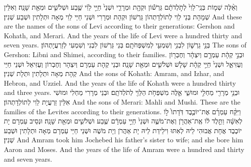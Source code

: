 {%
{וְאֵ֨לֶּה שְׁמ֤וֹת בְּנֵֽי־לֵוִי֙ לְתֹ֣לְדֹתָ֔ם גֵּרְשׁ֕וֹן וּקְהָ֖ת וּמְרָרִ֑י וּשְׁנֵי֙ חַיֵּ֣י לֵוִ֔י שֶׁ֧בַע וּשְׁלֹשִׁ֛ים וּמְאַ֖ת שָׁנָֽה׃
}
{וְאִלֵּין שְׁמָהָת בְּנֵי לֵוִי לְתוֹלְדָתְהוֹן גֵּרְשׁוֹן וּקְהָת וּמְרָרִי וּשְׁנֵי חַיֵּי לֵוִי מְאָה וּתְלָתִין וּשְׁבַע שְׁנִין׃}
{And these are the names of the sons of Levi according to their generations: Gershon and Kohath, and Merari. And the years of the life of Levi were a hundred thirty and seven years.}{}
{בְּנֵ֥י גֵרְשׁ֛וֹן לִבְנִ֥י וְשִׁמְעִ֖י לְמִשְׁפְּחֹתָֽם׃}
{בְּנֵי גֵּרְשׁוֹן לִבְנִי וְשִׁמְעִי לְזַרְעֲיָתְהוֹן׃}
{The sons of Gershon: Libni and Shimei, according to their families.}{}
{וּבְנֵ֣י קְהָ֔ת עַמְרָ֣ם וְיִצְהָ֔ר וְחֶבְר֖וֹן וְעֻזִּיאֵ֑ל וּשְׁנֵי֙ חַיֵּ֣י קְהָ֔ת שָׁלֹ֧שׁ וּשְׁלֹשִׁ֛ים וּמְאַ֖ת שָׁנָֽה׃
}
{וּבְנֵי קְהָת עַמְרָם וְיִצְהָר וְחֶבְרוֹן וְעֻזִּיאֵל וּשְׁנֵי חַיֵּי קְהָת מְאָה וּתְלָתִין וּתְלָת שְׁנִין׃}
{And the sons of Kohath: Amram, and Izhar, and Hebron, and Uzziel. And the years of the life of Kohath were a hundred thirty and three years.}{}
{וּבְנֵ֥י מְרָרִ֖י מַחְלִ֣י וּמוּשִׁ֑י אֵ֛לֶּה מִשְׁפְּחֹ֥ת הַלֵּוִ֖י לְתֹלְדֹתָֽם׃}
{וּבְנֵי מְרָרִי מַחְלִי וּמוּשִׁי אִלֵּין זַרְעֲיָת לֵוִי לְתוֹלְדָתְהוֹן׃}
{And the sons of Merari: Mahli and Mushi. These are the families of the Levites according to their generations.}{}
{וַיִּקַּ֨ח עַמְרָ֜ם אֶת־יוֹכֶ֤בֶד דֹּֽדָתוֹ֙ ל֣וֹ לְאִשָּׁ֔ה וַתֵּ֣לֶד ל֔וֹ אֶֽת־אַהֲרֹ֖ן וְאֶת־מֹשֶׁ֑ה וּשְׁנֵי֙ חַיֵּ֣י עַמְרָ֔ם שֶׁ֧בַע וּשְׁלֹשִׁ֛ים וּמְאַ֖ת שָׁנָֽה׃
}
{וּנְסֵיב עַמְרָם יָת יוֹכֶבֶד אֲחָת אֲבוּהִי לֵיהּ לְאִתּוּ וִילֵידַת לֵיהּ יָת אַהֲרֹן וְיָת מֹשֶׁה וּשְׁנֵי חַיֵּי עַמְרָם מְאָה וּתְלָתִין וּשְׁבַע שְׁנִין׃}
{And Amram took him Jochebed his father’s sister to wife; and she bore him Aaron and Moses. And the years of the life of Amram were a hundred and thirty and seven years.}{}
}
